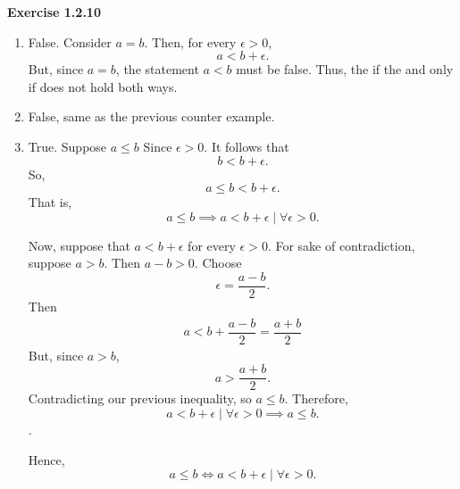 \documentclass[12pt]{article}
\begin{document}
\noindent{} \textbf{Exercise 1.2.10}
\begin{enumerate}
      \item [(a)] False. Consider $a = b$.
            Then, for every $\epsilon > 0$, \[a < b + \epsilon.\]
            But, since $a = b$, the statement $a < b$ must be false.
            Thus, the if the and only if does not hold both ways.

      \item [(b)] False, same as the previous counter example.
      \item [(c)] True. Suppose
            $a \leq b$
            Since $\epsilon > 0$. It follows that
            \[
                  b < b + \epsilon.
            \]
            So,
            \[
                  a \leq b < b + \epsilon.
            \]
            That is,
            \[
                  a \leq b \implies a < b + \epsilon \mid \forall \epsilon > 0.
            \]

            Now, suppose that $a < b + \epsilon$ for every $\epsilon > 0$.
            For sake of contradiction, suppose $a > b$.
            Then $a - b > 0$. Choose
            \[
                  \epsilon = \frac{a-b}{2}.
            \]
            Then
            \begin{align*}
                  a < b + \dfrac{a-b}{2} = \dfrac{a+b}{2}
            \end{align*}
            But, since $a > b$,
            \[
                  a > \dfrac{a+b}{2}.
            \]
            Contradicting our previous inequality, so $a \leq b$.
            Therefore,
            \[
                  a < b + \epsilon \mid \forall \epsilon > 0\implies a \leq b.
            \].

            Hence,
            \[
                  a \leq b \iff a < b + \epsilon \mid \forall \epsilon > 0.
            \]

\end{enumerate}
\end{document}
